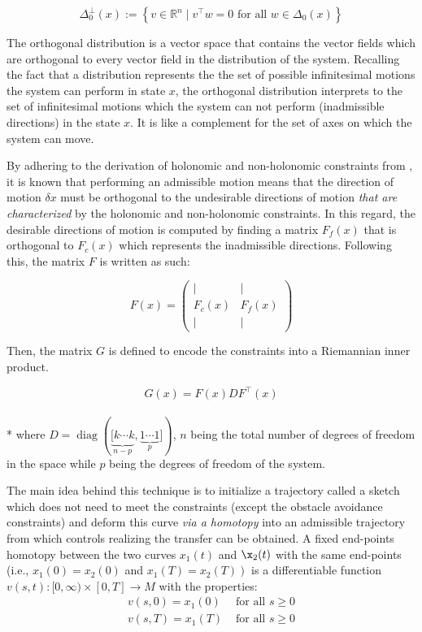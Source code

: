 \documentclass[letterpaper, 10 pt, conference]{ieeeconf}
\begin{document}
\begin{equation}
\Delta_{0}^{\perp}(x):=\left\{v \in \mathbb{R}^{n} \mid v^{\top} w=0 \text { for all } w \in \Delta_{0}(x)\right\}
\end{equation}

The orthogonal distribution is a vector space that contains the vector fields which are orthogonal to every vector field in the distribution of the system. Recalling the fact that a distribution represents the the set of possible infinitesimal motions the system can perform in state $x$, the orthogonal distribution interprets to the set of infinitesimal motions which the system can not perform (inadmissible directions) in the state $x$. It is like a complement for the set of axes on which the system can move.

By adhering to the derivation of holonomic and non-holonomic constraints from \cite{PAPER2}, it is known that performing an admissible motion means that the direction of motion $\delta x$ must be orthogonal to the undesirable directions of motion \textit{that are characterized} by the holonomic and non-holonomic constraints. In this regard, the desirable directions of motion is computed by finding a matrix $F_f(x)$ that is orthogonal to $F_c(x)$ which represents the inadmissible directions. Following this, the matrix $F$ is written as such:

\begin{equation}
F(x)=\left(\begin{array}{cc}
\mid & \mid \\
F_{c}(x) & F_{f}(x) \\
\mid & \mid
\end{array}\right)
\end{equation}

Then, the matrix $G$ is defined to encode the constraints into a Riemannian inner product.

\begin{equation}
G(x) = F(x) D F^{\top}(x)
\end{equation}
\\*
where $D=\operatorname{diag}(\underbrace{[k \cdots k}_{n-p}, \underbrace{1 \cdots 1}_{p}])$, $n$ being the total number of degrees of freedom in the space while $p$ being the degrees of freedom of the system. 

The main idea behind this technique is to initialize a trajectory called a sketch which does not need to meet the constraints (except the obstacle avoidance constraints) and deform this curve \textit{via a homotopy} into an admissible trajectory from which controls realizing the transfer can be obtained. A fixed end-points homotopy \cite{PAPER2} between the two curves $x_{1}(t)$ and $\x_{2}(t)$ with the same end-points (i.e., $x_{1}(0)= x_{2}(0)$ and $\left.x_{1}(T)=x_{2}(T)\right)$ is a differentiable function $v(s, t):[0, \infty) \times[0, T] \rightarrow M$ with the properties:
$$
\begin{array}{ll}v(s, 0)= x_{1}(0) & \text { for all } s \geq 0 \\ v(s, T) = x_{1}(T) & \text { for all } s \geq 0\end{array}
$$
\end{document}
